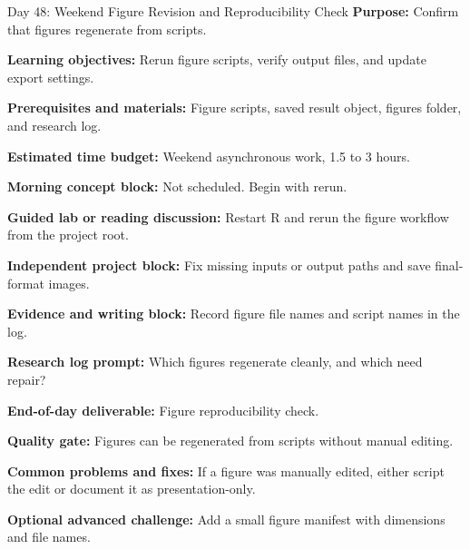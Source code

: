 \begin{dailybox}{Day 48: Weekend Figure Revision and Reproducibility Check}
\textbf{Purpose:} Confirm that figures regenerate from scripts.

\textbf{Learning objectives:} Rerun figure scripts, verify output files, and update export settings.

\textbf{Prerequisites and materials:} Figure scripts, saved result object, figures folder, and research log.

\textbf{Estimated time budget:} Weekend asynchronous work, 1.5 to 3 hours.

\textbf{Morning concept block:} Not scheduled. Begin with rerun.

\textbf{Guided lab or reading discussion:} Restart R and rerun the figure workflow from the project root.

\textbf{Independent project block:} Fix missing inputs or output paths and save final-format images.

\textbf{Evidence and writing block:} Record figure file names and script names in the log.

\textbf{Research log prompt:} Which figures regenerate cleanly, and which need repair?

\textbf{End-of-day deliverable:} Figure reproducibility check.

\textbf{Quality gate:} Figures can be regenerated from scripts without manual editing.

\textbf{Common problems and fixes:} If a figure was manually edited, either script the edit or document it as presentation-only.

\textbf{Optional advanced challenge:} Add a small figure manifest with dimensions and file names.
\end{dailybox}

